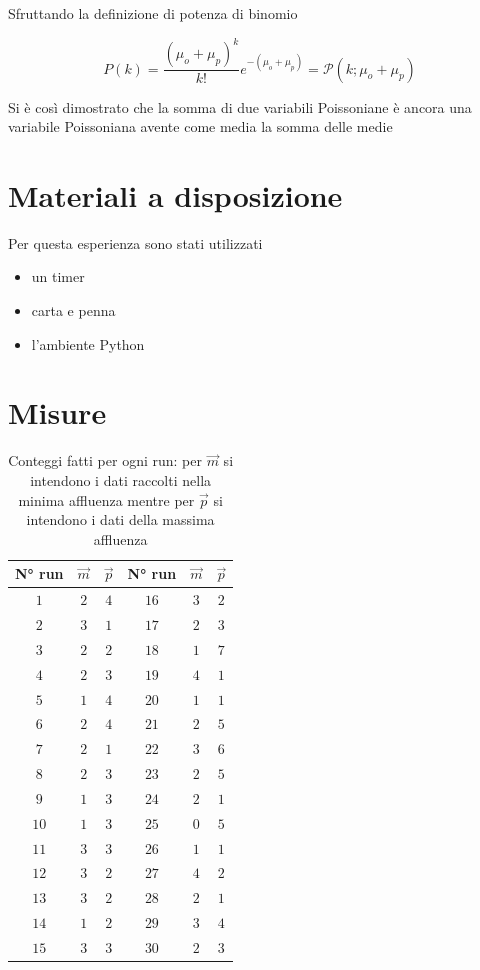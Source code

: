 \documentclass[a4paper,12pt]{article}
\begin{document}
Sfruttando la definizione di potenza di binomio

\begin{equation}
    P(k) = \dfrac{{(\mu_o+\mu_p)}^k}{k!}e^{-(\mu_o+\mu_p)} = \mathcal{P}(k;\mu_o+\mu_p)
\end{equation}

Si è così dimostrato che la somma di due variabili Poissoniane è ancora una variabile Poissoniana avente come media la somma delle medie

\section{Materiali a disposizione}

Per questa esperienza sono stati utilizzati

\begin{itemize}
    \item un timer
    \item carta e penna
    \item l'ambiente Python
\end{itemize}

\section{Misure}


\begin{table}[h!]
    \centering
    \begin{tabular}{c c c|c c c}
        \toprule
        N° run & $\vec{m}$ & $\vec{p}$ & N° run & $\vec{m}$ & $\vec{p}$ \\
        \midrule
        $1$  & $2$ & $4$ & $16$ & $3$ & $2$ \\
        $2$  & $3$ & $1$ & $17$ & $2$ & $3$ \\
        $3$  & $2$ & $2$ & $18$ & $1$ & $7$ \\
        $4$  & $2$ & $3$ & $19$ & $4$ & $1$ \\
        $5$  & $1$ & $4$ & $20$ & $1$ & $1$ \\
        $6$  & $2$ & $4$ & $21$ & $2$ & $5$ \\
        $7$  & $2$ & $1$ & $22$ & $3$ & $6$ \\
        $8$  & $2$ & $3$ & $23$ & $2$ & $5$ \\
        $9$  & $1$ & $3$ & $24$ & $2$ & $1$ \\
        $10$ & $1$ & $3$ & $25$ & $0$ & $5$ \\
        $11$ & $3$ & $3$ & $26$ & $1$ & $1$ \\
        $12$ & $3$ & $2$ & $27$ & $4$ & $2$ \\
        $13$ & $3$ & $2$ & $28$ & $2$ & $1$ \\
        $14$ & $1$ & $2$ & $29$ & $3$ & $4$ \\
        $15$ & $3$ & $3$ & $30$ & $2$ & $3$ \\
        \bottomrule
    \end{tabular}
    \caption{Conteggi fatti per ogni run: per $\vec{m}$ si intendono i dati raccolti nella minima affluenza mentre per $\vec{p}$ si intendono i dati della massima affluenza}%
    \label{tab:conteggi}
\end{table}
\end{document}
